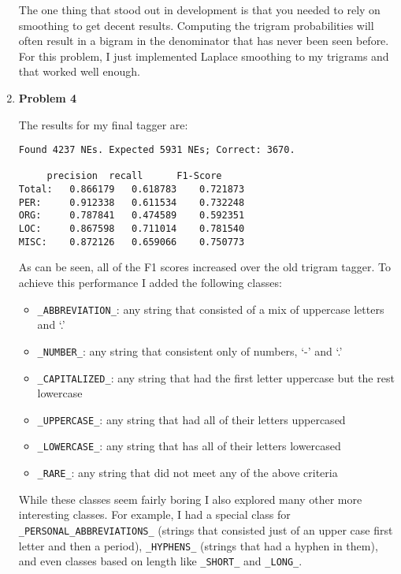 \documentclass[10pt]{article}
\begin{document}
\begin{enumerate}
The one thing that stood out in development is that you needed to rely on smoothing to get decent results. Computing the trigram probabilities will often result in a bigram in the denominator that has never been seen before. For this problem, I just implemented Laplace smoothing to my trigrams and that worked well enough.


\newpage

\item {\bf Problem 4}

The results for my final tagger are:

\begin{verbatim}
Found 4237 NEs. Expected 5931 NEs; Correct: 3670.

	 precision 	recall 		F1-Score
Total:	 0.866179	0.618783	0.721873
PER:	 0.912338	0.611534	0.732248
ORG:	 0.787841	0.474589	0.592351
LOC:	 0.867598	0.711014	0.781540
MISC:	 0.872126	0.659066	0.750773
\end{verbatim}


As can be seen, all of the F1 scores increased over the old trigram tagger. To achieve this performance I added the following classes:

\begin{itemize}

\item {\tt \_ABBREVIATION\_}: any string that consisted of a mix of uppercase letters and `.'

\item {\tt \_NUMBER\_}: any string that consistent only of numbers, `-' and `.'

\item {\tt \_CAPITALIZED\_}: any string that had the first letter uppercase but the rest lowercase

\item {\tt \_UPPERCASE\_}: any string that had all of their letters uppercased

\item {\tt \_LOWERCASE\_}: any string that has all of their letters lowercased

\item {\tt \_RARE\_}: any string that did not meet any of the above criteria

\end{itemize}

While these classes seem fairly boring I also explored many other more interesting classes. For example, I had a special class for {\tt \_PERSONAL\_ABBREVIATIONS\_} (strings that consisted just of an upper case first letter and then a period), {\tt \_HYPHENS\_} (strings that had a hyphen in them), and even classes based on length like {\tt \_SHORT\_} and {\tt \_LONG\_}. 


\end{enumerate}
\end{document}
